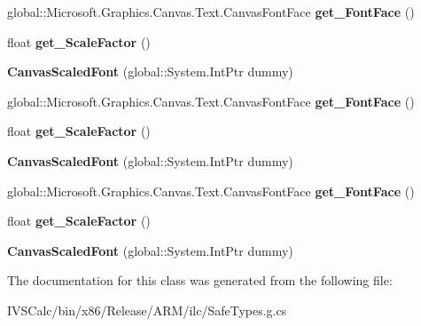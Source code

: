 \begin{DoxyCompactItemize}
global\+::\+Microsoft.\+Graphics.\+Canvas.\+Text.\+Canvas\+Font\+Face {\bfseries get\+\_\+\+Font\+Face} ()
\item 
\mbox{\label{class_microsoft_1_1_graphics_1_1_canvas_1_1_text_1_1_canvas_scaled_font_a27b7b2da3a54ca18b66a84fe732b43dd}} 
float {\bfseries get\+\_\+\+Scale\+Factor} ()
\item 
\mbox{\label{class_microsoft_1_1_graphics_1_1_canvas_1_1_text_1_1_canvas_scaled_font_a54eee3f19978bcbc725a49e58a6e14d4}} 
{\bfseries Canvas\+Scaled\+Font} (global\+::\+System.\+Int\+Ptr dummy)
\item 
\mbox{\label{class_microsoft_1_1_graphics_1_1_canvas_1_1_text_1_1_canvas_scaled_font_ace99f2d30529dc2c60d0c11206e2aba2}} 
global\+::\+Microsoft.\+Graphics.\+Canvas.\+Text.\+Canvas\+Font\+Face {\bfseries get\+\_\+\+Font\+Face} ()
\item 
\mbox{\label{class_microsoft_1_1_graphics_1_1_canvas_1_1_text_1_1_canvas_scaled_font_a27b7b2da3a54ca18b66a84fe732b43dd}} 
float {\bfseries get\+\_\+\+Scale\+Factor} ()
\item 
\mbox{\label{class_microsoft_1_1_graphics_1_1_canvas_1_1_text_1_1_canvas_scaled_font_a54eee3f19978bcbc725a49e58a6e14d4}} 
{\bfseries Canvas\+Scaled\+Font} (global\+::\+System.\+Int\+Ptr dummy)
\item 
\mbox{\label{class_microsoft_1_1_graphics_1_1_canvas_1_1_text_1_1_canvas_scaled_font_ace99f2d30529dc2c60d0c11206e2aba2}} 
global\+::\+Microsoft.\+Graphics.\+Canvas.\+Text.\+Canvas\+Font\+Face {\bfseries get\+\_\+\+Font\+Face} ()
\item 
\mbox{\label{class_microsoft_1_1_graphics_1_1_canvas_1_1_text_1_1_canvas_scaled_font_a27b7b2da3a54ca18b66a84fe732b43dd}} 
float {\bfseries get\+\_\+\+Scale\+Factor} ()
\item 
\mbox{\label{class_microsoft_1_1_graphics_1_1_canvas_1_1_text_1_1_canvas_scaled_font_a54eee3f19978bcbc725a49e58a6e14d4}} 
{\bfseries Canvas\+Scaled\+Font} (global\+::\+System.\+Int\+Ptr dummy)
\end{DoxyCompactItemize}


The documentation for this class was generated from the following file\+:\begin{DoxyCompactItemize}
\item 
I\+V\+S\+Calc/bin/x86/\+Release/\+A\+R\+M/ilc/Safe\+Types.\+g.\+cs\end{DoxyCompactItemize}
